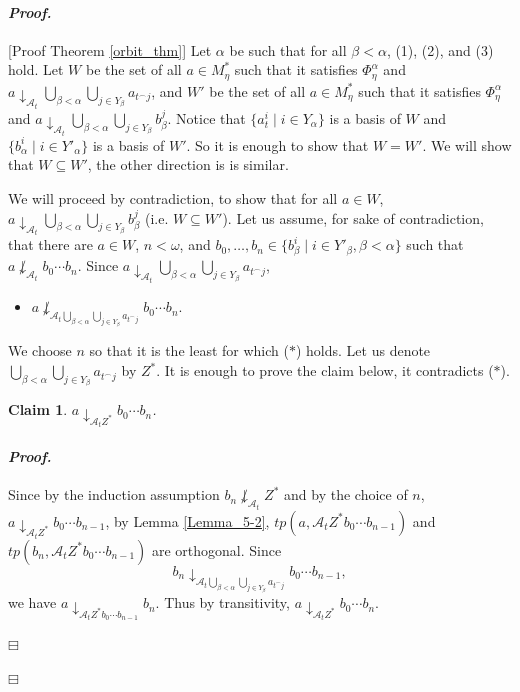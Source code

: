 \documentclass[12pt,a4paper]{amsart}
\newtheorem{claim}{Claim}[thm]
\theoremstyle{definition}
\theoremstyle{remark}
\renewcommand{\mid}{\mathrel{|}\allowbreak}
\newenvironment{cproof}{\paragraph{\emph{Proof.\,}}}{\hfill{$\boxminus$}\par\vspace{2mm}}
\begin{document}
\begin{cproof}[Proof Theorem \ref{orbit_thm}]
Let $\alpha$ be such that for all $\beta<\alpha$, (1), (2), and (3) hold.
Let $W$ be the set of all $a\in M_\eta^*$ such that it satisfies $\Phi^\alpha_\eta$ and $a\downarrow_{\mathcal{A}_t}\bigcup_{\beta< \alpha}\bigcup_{j\in Y_\beta}a_{t^\frown j}$, and $W'$ be the set of all $a\in M_\eta^*$ such that it satisfies $\Phi^\alpha_\eta$ and $a\downarrow_{\mathcal{A}_t}\bigcup_{\beta< \alpha}\bigcup_{j\in Y_\beta}b_\beta^j$.
Notice that $\{a_t^i\mid i\in Y_\alpha\}$ is a basis of $W$ and $\{b_\alpha^i\mid i\in Y'_\alpha\}$ is a basis of $W'$. So it is enough to show that $W=W'$.
We will show that $W\subseteq W'$, the other direction is is similar.

   We will proceed by contradiction, to show that for all $a\in W$, $a\downarrow_{\mathcal{A}_t}\bigcup_{\beta< \alpha}\bigcup_{j\in Y_\beta}b_\beta^j$ (i.e. $W\subseteq W'$).
Let us assume, for sake of contradiction, that there are $a\in W$, $n<\omega$, and $b_0,\ldots,b_n\in \{b_\beta^i\mid i\in Y'_\beta, \beta<\alpha\}$ such that $a\not\downarrow_{\mathcal{A}_t}b_0\cdots b_n$. Since $a\downarrow_{\mathcal{A}_t}\bigcup_{\beta< \alpha}\bigcup_{j\in Y_\beta}a_{t^\frown j}$, 
\begin{itemize}
    \item [($\ast$)] \begin{center}
        $a\not\downarrow_{\mathcal{A}_t\bigcup_{\beta< \alpha}\bigcup_{j\in Y_\beta}a_{t^\frown j}}b_0\cdots b_n.$
    \end{center}
\end{itemize}
We choose $n$ so that it is the least for which ($*$) holds.
Let us denote $\bigcup_{\beta< \alpha}\bigcup_{j\in Y_\beta}a_{t^\frown j}$ by $Z^*$. 
It is enough to prove the claim below, it contradicts ($\ast$). 
\begin{claim}
    $a\downarrow_{\mathcal{A}_tZ^*}b_0 \cdots b_n$.
\end{claim}
\begin{cproof}
Since by the induction assumption $b_n\not\downarrow_{\mathcal{A}_t}Z^*$ and by the choice of $n$, $a\downarrow_{\mathcal{A}_t Z^*}b_0\cdots b_{n-1}$, by Lemma \ref{Lemma_5-2}, $tp(a,\mathcal{A}_tZ^* b_0 \cdots b_{n-1})$ and $tp(b_n,\mathcal{A}_tZ^* b_0 \cdots b_{n-1})$ are orthogonal. Since $$b_n\downarrow_{\mathcal{A}_t\bigcup_{\beta< \alpha}\bigcup_{j\in Y_\beta}a_{t^\frown j}}b_0\cdots b_{n-1},$$ we have $a\downarrow_{\mathcal{A}_tZ^*b_0\cdots b_{n-1}}b_n$.
Thus by transitivity, $a\downarrow_{\mathcal{A}_tZ^*}b_0 \cdots b_n$.
    

\end{cproof}
\end{cproof}
\end{document}
